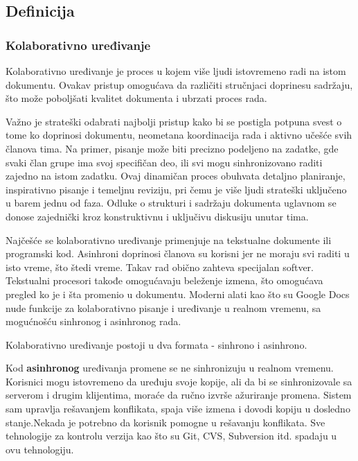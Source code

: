 \documentclass[12pt]{article}
\begin{document}
   \vspace{+0.5cm}
   
   \subsection{Definicija}

   \subsubsection{Kolaborativno uređivanje}

    Kolaborativno uređivanje je proces u kojem više ljudi istovremeno radi na istom dokumentu. Ovakav pristup omogućava da različiti stručnjaci doprinesu sadržaju, što može poboljšati kvalitet dokumenta i ubrzati proces rada.

    Važno je strateški odabrati najbolji pristup kako bi se postigla potpuna svest o tome ko doprinosi dokumentu, neometana koordinacija rada i aktivno učešće svih članova tima. Na primer, pisanje može biti precizno podeljeno na zadatke, gde svaki član grupe ima svoj specifičan deo, ili svi mogu sinhronizovano raditi zajedno na istom zadatku. Ovaj dinamičan proces obuhvata detaljno planiranje, inspirativno pisanje i temeljnu reviziju, pri čemu je više ljudi strateški uključeno u barem jednu od faza. Odluke o strukturi i sadržaju dokumenta uglavnom se donose zajednički kroz konstruktivnu i uključivu diskusiju unutar tima.
    
    Najčešće se kolaborativno uređivanje primenjuje na tekstualne dokumente ili programski kod. Asinhroni doprinosi članova su korisni jer ne moraju svi raditi u isto vreme, što štedi vreme. Takav rad obično zahteva specijalan softver. Tekstualni procesori takođe omogućavaju beleženje izmena, što omogućava pregled ko je i šta promenio u dokumentu. Moderni alati kao što su Google Docs nude funkcije za kolaborativno pisanje i uređivanje u realnom vremenu, sa mogućnošću sinhronog i asinhronog rada.

    Kolaborativno uređivanje postoji u dva formata - sinhrono i asinhrono.

    Kod \textbf{asinhronog} uređivanja promene se ne sinhronizuju u realnom vremenu. Korisnici mogu istovremeno da uređuju svoje kopije, ali da bi se sinhronizovale sa serverom i drugim klijentima, moraće da ručno izvrše ažuriranje promena. Sistem sam upravlja rešavanjem konflikata, spaja više izmena i dovodi kopiju u dosledno stanje.Nekada je potrebno da korisnik pomogne u rešavanju konflikata. Sve tehnologije za kontrolu verzija kao što su Git, CVS, Subversion itd. spadaju u ovu tehnologiju.
\end{document}
